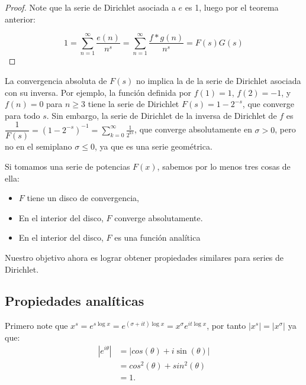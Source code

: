 \begin{proof}
Note que la serie de Dirichlet asociada a $e$ es 1, luego por el teorema anterior:

$$1=\sum_{n=1}^{\infty} \frac{e(n)}{n^s}=\sum_{n=1}^{\infty} \frac{f*g(n)}{n^s}=F(s)G(s)$$
\end{proof}

\begin{note}
La convergencia absoluta de \( F(s) \) no implica la de la serie de Dirichlet asociada con su inversa. Por ejemplo, la función definida por \( f(1)=1 \), \( f(2)=-1 \), y \( f(n)=0 \) para \( n \geq 3 \) tiene la serie de Dirichlet \( F(s)=1-2^{-s} \), que converge para todo $s$. Sin embargo, la serie de Dirichlet de la inversa de Dirichlet de \( f \) es \( \dfrac{1}{F(s)} = (1-2^{-s})^{-1} = \displaystyle\sum_{k=0}^{\infty} \frac{1}{2^{ks}} \), que converge absolutamente en \( \sigma > 0 \), pero no en el semiplano \( \sigma \leq 0 \), ya que es una serie geométrica. \cite{hildebrand2006introduction}
\end{note}

Si tomamos una serie de potencias $F(x)$, sabemos por lo menos tres cosas de ella:

\begin{itemize}[label=$\bullet$]
    \item $F$ tiene un disco de convergencia, 

    \item En el interior del disco, $F$ converge absolutamente.

    \item En el interior del disco, $F$ es una función analítica \cite{Apostol:105425}
\end{itemize}

Nuestro objetivo ahora es lograr obtener propiedades similares para series de Dirichlet.
\subsection{Propiedades analíticas}

Primero note que $\displaystyle x^{\displaystyle  s}=e^{\displaystyle s\log x}=e^{\displaystyle(\sigma+it)\log x}=x^{\displaystyle\sigma}e^{\displaystyle it\log{x}}$, por tanto $|\displaystyle x^{\displaystyle s}|=|x^{\displaystyle\sigma}|$ ya que:
\begin{align*}
     \left|e^{\displaystyle i\theta}\right|&=|cos(\theta)+i\sin(\theta)|\\
     &=cos^2(\theta)+sin^2(\theta)\\
     &=1
 .\end{align*} 

